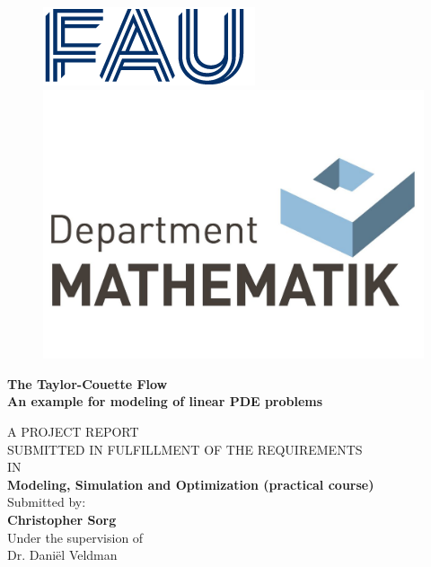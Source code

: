 \documentclass[12pt,a4paper]{report}
\begin{document}
\begin{center}
\begin{figure}[H]
    \raggedright
    \includegraphics[scale=0.8]{FAU.png}
    \tab 
    \raggedleft
    \includegraphics[scale=0.12]{cropped-FAU_DMM_Logo_rgb_10cm-3-konvertiert.pdf}\\
    \label{fig:DTU logo}
\end{figure}
{\Large \textbf{The Taylor-Couette Flow}}\\
\textbf{An example for modeling of linear PDE problems} \\
\vspace{0.5cm}

A PROJECT REPORT\\
SUBMITTED IN FULFILLMENT OF THE REQUIREMENTS\\
IN\\
\textbf{Modeling, Simulation and Optimization (practical course)} \\
\vspace{1 cm}
Submitted by: \\

\textbf{Christopher Sorg}\\
\vspace{0.2cm}
\vspace{1 cm}
Under the supervision of\\

Dr. Daniël Veldman\\

\end{center}
\end{document}
